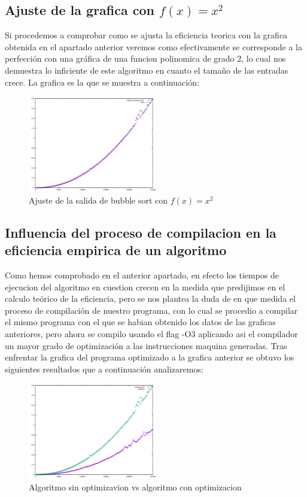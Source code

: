 \subsection{Ajuste de la grafica con $f(x)=x^{2}$}
Si procedemos a comprobar como se ajusta la eficiencia teorica con la grafica obtenida en el apartado anterior veremos como efectivamente se corresponde a la perfección con una gráfica de una funcion polinomica de grado 2, lo cual nos demuestra lo inficiente de este algoritmo en cuanto el tamaño de las entradas crece. La grafica es la que se muestra a continuación:

\begin{figure}[ht]
  \centering
  \includegraphics[width=0.5\textwidth]{./Imagenes/burbuja_ajustada.png}
  \caption{Ajuste de la salida de bubble sort con $f(x)=x^{2}$}
\end{figure}

\subsection{Influencia del proceso de compilacion en la eficiencia empirica de un algoritmo}
Como hemos comprobado en el anterior apartado, en efecto los tiempos de ejecucion del algoritmo en cuestion crecen en la medida que predijimos en el calculo teórico de la eficiencia, pero se nos plantea la duda de en que medida el proceso de compilación de nuestro programa, con lo cual se procedio a compilar el mismo programa con el que se habian obtenido los datos de las graficas anteriores, pero ahora se compilo usando el flag -O3 aplicando asi el compilador un mayor grado de optimización a las instrucciones maquina generadas. Tras enfrentar la grafica del programa optimizado a la grafica anterior se obtuvo los siguientes resultados que a continuación analizaremos:

\begin{figure}[H]
  \centering
  \includegraphics[width=0.5\textwidth]{./Imagenes/burbuja_vs_eficaz.png}
  \caption{Algoritmo sin optimizavion vs algoritmo con optimizacion}
\end{figure}

